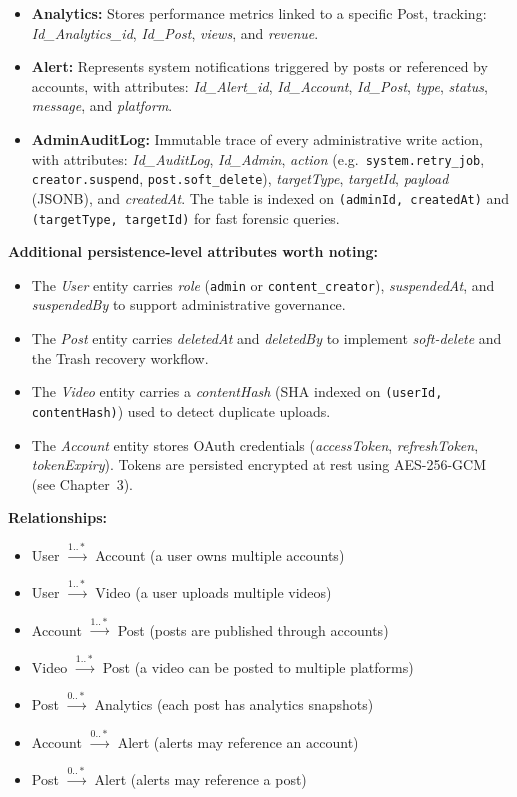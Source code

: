 \begin{itemize}
    \item \textbf{Analytics:} Stores performance metrics linked to a specific Post, tracking: \textit{Id\_Analytics\_id}, \textit{Id\_Post}, \textit{views}, and \textit{revenue}.
    \item \textbf{Alert:} Represents system notifications triggered by posts or referenced by accounts, with attributes: \textit{Id\_Alert\_id}, \textit{Id\_Account}, \textit{Id\_Post}, \textit{type}, \textit{status}, \textit{message}, and \textit{platform}.
    \item \textbf{AdminAuditLog:} Immutable trace of every administrative write action, with attributes: \textit{Id\_AuditLog}, \textit{Id\_Admin}, \textit{action} (e.g.\ \texttt{system.retry\_job}, \texttt{creator.suspend}, \texttt{post.soft\_delete}), \textit{targetType}, \textit{targetId}, \textit{payload} (JSONB), and \textit{createdAt}. The table is indexed on \texttt{(adminId, createdAt)} and \texttt{(targetType, targetId)} for fast forensic queries.
\end{itemize}

\medskip
\noindent\textbf{Additional persistence-level attributes worth noting:}
\begin{itemize}
    \item The \textit{User} entity carries \textit{role} (\texttt{admin} or \texttt{content\_creator}), \textit{suspendedAt}, and \textit{suspendedBy} to support administrative governance.
    \item The \textit{Post} entity carries \textit{deletedAt} and \textit{deletedBy} to implement \emph{soft-delete} and the Trash recovery workflow.
    \item The \textit{Video} entity carries a \textit{contentHash} (SHA indexed on \texttt{(userId, contentHash)}) used to detect duplicate uploads.
    \item The \textit{Account} entity stores OAuth credentials (\textit{accessToken}, \textit{refreshToken}, \textit{tokenExpiry}). Tokens are persisted encrypted at rest using AES-256-GCM (see Chapter~3).
\end{itemize}


\textbf{Relationships:}
\begin{itemize}
    \item User $\xrightarrow{1..*}$ Account (a user owns multiple accounts)
    \item User $\xrightarrow{1..*}$ Video (a user uploads multiple videos)
    \item Account $\xrightarrow{1..*}$ Post (posts are published through accounts)
    \item Video $\xrightarrow{1..*}$ Post (a video can be posted to multiple platforms)
    \item Post $\xrightarrow{0..*}$ Analytics (each post has analytics snapshots)
    \item Account $\xrightarrow{0..*}$ Alert (alerts may reference an account)
    \item Post $\xrightarrow{0..*}$ Alert (alerts may reference a post)
\end{itemize}


